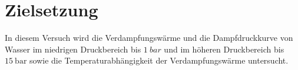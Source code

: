 \section{Zielsetzung}
\label{sec:Zielsetzung}
In diesem Versuch wird die Verdampfungswärme und die Dampfdruckkurve von Wasser
im niedrigen Druckbereich bis $\SI{1}{bar}$ und im höheren Druckbereich bis
$\SI{15}{\bar}$ sowie die Temperaturabhängigkeit der Verdampfungswärme untersucht.
